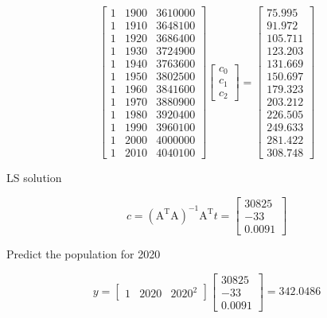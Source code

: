 \documentclass[conference]{IEEEtran}
\begin{document}
\[\begin{bmatrix}
1 & 1900 & 3610000\\
1 & 1910 & 3648100\\
1 & 1920 & 3686400\\
1 & 1930 & 3724900\\
1 & 1940 & 3763600\\
1 & 1950 & 3802500\\
1 & 1960 & 3841600\\
1 & 1970 & 3880900\\
1 & 1980 & 3920400\\
1 & 1990 & 3960100\\
1 & 2000 & 4000000\\
1 & 2010 & 4040100
\end{bmatrix}
\begin{bmatrix}
c_0 \\
c_1 \\
c_2
\end{bmatrix} = 
\begin{bmatrix}
75.995\\
91.972\\
105.711\\
123.203\\
131.669\\
150.697\\
179.323\\
203.212\\
226.505\\
249.633\\
281.422\\
308.748
\end{bmatrix}\]

LS solution

\[ c = (\mathrm{A}^\mathrm{T}\mathrm{A})^{-1}\mathrm{A}^\mathrm{T}t = 
\begin{bmatrix}
30825 \\
-33 \\
0.0091
\end{bmatrix}\] 

Predict the population for 2020

\[ y = \begin{bmatrix}
1 & 2020 & 2020^2
\end{bmatrix}\begin{bmatrix}
30825 \\
-33 \\
0.0091
\end{bmatrix} = 342.0486\]
\end{document}
